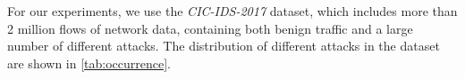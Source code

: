 \documentclass[conference]{IEEEtran}
\begin{document}
For our experiments, we use the \textit{CIC-IDS-2017} \cite{sharafaldin_toward_2018} dataset, which includes more than 2 million flows of network data, containing both benign traffic and a large number of different attacks. The distribution of different attacks in the dataset are shown in \autoref{tab:occurrence}.
\end{document}
